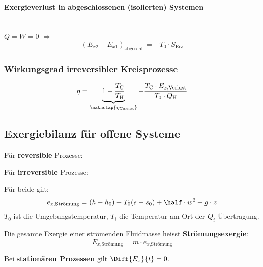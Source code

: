 		\paragraph{Exergieverlust in abgeschlossenen (isolierten) Systemen}~\\ %
			$Q=W=0$ $\Rightarrow$
			\[
				(E_{x2} - E_{x1})_\text{abgeschl.} = - T_0 \cdot S_\text{Erz}
			\]
		
		\subsubsection{Wirkungsgrad irreversibler Kreisprozesse} %
			\[
				\eta = \underbrace{1- \frac{T_\text{C}}{T_\text{H}}}_{\mathclap{\eta_\text{Carnot}}} - \frac{T_\text{C} \cdot E_{x\text{,Verlust}}}{T_0\cdot Q_\text{H}}
			\]
	
	\subsection{Exergiebilanz für offene Systeme} %
		Für \textbf{reversible} Prozesse:
		
		Für \textbf{irreversible} Prozesse:
		
		Für beide gilt:
		\[
			e_{x\text{,Strömung}} = (h-h_0) - T_0(s-s_0) + \half \cdot w^2 + g\cdot z
		\]
		$T_0$ ist die Umgebungstemperatur, $T_i$ die Temperatur am Ort der $Q_i$-Übertragung.
		
		Die gesamte Exergie einer strömenden Fluidmasse heisst \textbf{Strömungsexergie}:
		\[
			E_{x\text{,Strömung}} = m \cdot e_{x\text{,Strömung}}
		\]
		
		Bei \textbf{stationären Prozessen} gilt $\Diff{E_x}{t} =0$.
	
